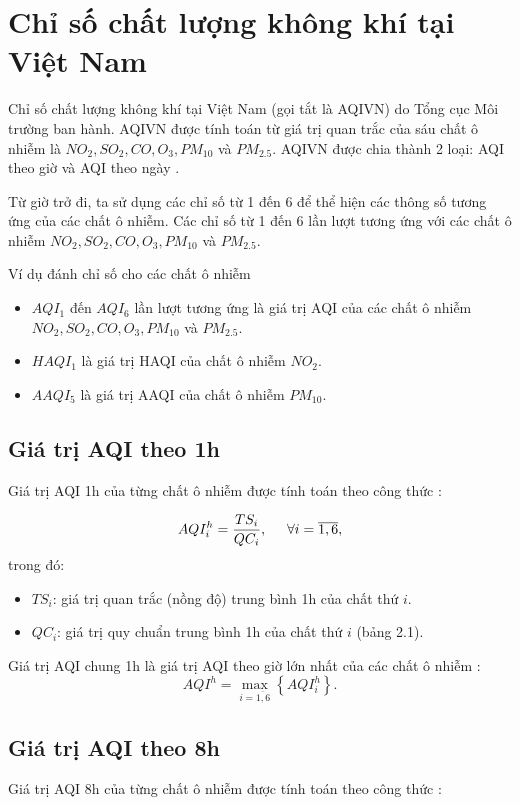 \documentclass[14pt]{extreport}
\theoremstyle{definition}
\theoremstyle{plain}
\theoremstyle{remark}
\begin{document}
\section{Chỉ số chất lượng không khí tại Việt Nam}
Chỉ số chất lượng không khí tại Việt Nam (gọi tắt là AQIVN) do Tổng cục Môi trường ban hành. AQIVN được tính toán từ giá trị quan trắc của sáu chất ô nhiễm là $NO_2, SO_2, CO, O_3, PM_{10}$ và $PM_{2.5}$. AQIVN được chia thành 2 loại: AQI theo giờ và AQI theo ngày \cite{TCMT2011}.

Từ giờ trở đi, ta sử dụng các chỉ số từ 1 đến 6 để thể hiện các thông số tương ứng của các chất ô nhiễm. Các chỉ số từ 1 đến 6 lần lượt tương ứng với các chất ô nhiễm $NO_2, SO_2, CO, O_3, PM_{10}$ và $PM_{2.5}$.

\example Ví dụ đánh chỉ số cho các chất ô nhiễm
\begin{itemize}
\item	$AQI_1$ đến $AQI_6$ lần lượt tương ứng là giá trị AQI của các chất ô nhiễm $NO_2, SO_2, CO, O_3, PM_{10}$ và $PM_{2.5}$.
\item 	$HAQI_1$ là giá trị HAQI của chất ô nhiễm $NO_2$.
\item 	$AAQI_5$ là giá trị AAQI của chất ô nhiễm $PM_{10}$.
\end{itemize} 	

\subsection{Giá trị AQI theo 1h}
Giá trị AQI 1h của từng chất ô nhiễm được tính toán theo công thức \cite{TCMT2011}:

\begin{equation}
AQI_i^h = \dfrac{TS_i}{QC_i}, \hspace{0.5cm}  \forall i=\overline{1,6},
\end{equation}
trong đó:	 
\begin{itemize}
\item $TS_i$: giá trị quan trắc (nồng độ) trung bình 1h của chất thứ $i$.
\item $QC_i$: giá trị quy chuẩn trung bình 1h của chất thứ $i$ (bảng 2.1).
\end{itemize}

Giá trị AQI chung 1h là giá trị AQI theo giờ lớn nhất của các chất ô nhiễm \cite{TCMT2011}:
\begin{equation}
AQI^h = \max_{i=\overline{1,6}}\left\lbrace AQI_i^h\right\rbrace.
\end{equation}

\subsection{Giá trị AQI theo 8h}
Giá trị AQI 8h của từng chất ô nhiễm được tính toán theo công thức \cite{TCMT2011}:
\end{document}
